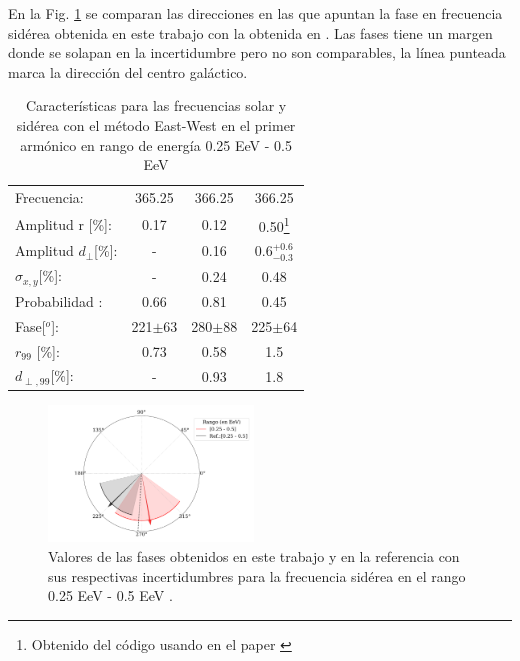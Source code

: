 En la Fig. \ref{fig:primer} se comparan las direcciones en las que apuntan la fase en frecuencia sidérea obtenida en este trabajo con la obtenida en \cite{Aab_2020}. 
Las fases tiene un margen donde se solapan en la incertidumbre pero no son comparables, la línea punteada marca la dirección del centro galáctico.
\begin{table}[H]
    \begin{small}
        \begin{center}
            \begin{tabular}[c]{l|c||c|c}
                Frecuencia:                 & 365.25	  & 366.25	   & 366.25 \cite{Aab_2020}   \\
                Amplitud r [\%]:            & 0.17	      & 0.12	   & 0.50\footnote[2]{\label{note1}Obtenido del código usando en el paper \cite{Aab_2020}}      \\
                Amplitud $d_\perp$[\%]:     & -	          & 0.16	   & $0.6^{+0.6}_{-0.3}$       \\
                $\sigma_{x,y}$[\%]:         & -	          & 0.24	   & 0.48       \\
                Probabilidad      :         & 0.66        & 0.81	   & 0.45       \\
                Fase[$^o$]:                 & 221$\pm$63  & 280$\pm$88 & 225$\pm$64\footnotemark[3]\\
                $r_{99}$ [\%]:              & 0.73	      & 0.58       & 1.5\footnotemark[2]                \\
                $d_{\perp,99}$[\%]:         & -           & 0.93       & 1.8      \\
            \end{tabular}
        \end{center}
    \end{small}
    \caption{Características para las frecuencias solar y sidérea con el método East-West en el primer armónico en rango de energía 0.25 EeV - 0.5 EeV}
    \label{tab:solar}
\end{table}
\begin{figure}[H]
    \begin{small}
        \begin{center}
            \includegraphics[width=0.485\textwidth]{phase_primer_bin.pdf}
        \end{center}
        \caption{Valores de las fases obtenidos en este trabajo y en la referencia con sus respectivas incertidumbres para la frecuencia sidérea en el  rango 0.25 EeV - 0.5 EeV .}
        \label{fig:primer}
    \end{small}
\end{figure}

